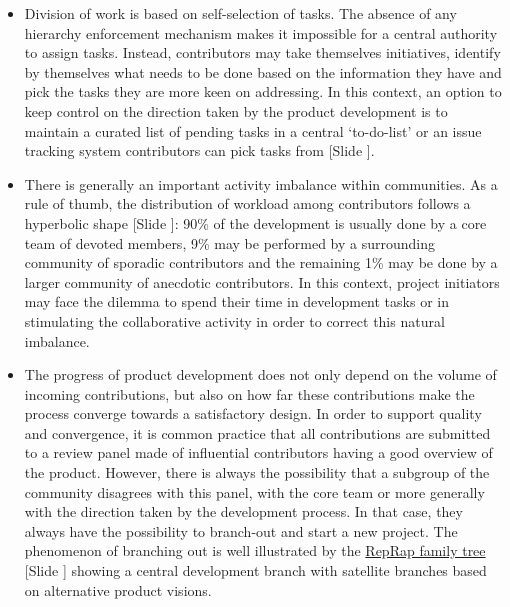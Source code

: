 \documentclass{article}
\newcounter{slide}
\begin{document}
\begin{itemize}
	\item Division of work is based on self-selection of tasks. The absence of any hierarchy enforcement mechanism makes it impossible for a central authority to assign tasks. Instead, contributors may take themselves initiatives, identify by themselves what needs to be done based on the information they have and pick the tasks they are more keen on addressing. In this context, an option to keep control on the direction taken by the product development is to maintain a curated list of pending tasks in a central `to-do-list' or an issue tracking system contributors can pick tasks from {\color{blue}[Slide ]}.
	\item There is generally an important activity imbalance within communities. As a rule of thumb, the distribution of workload among contributors follows a hyperbolic shape {\color{blue}[Slide ]}: 90\% of the development is usually done by a core team of devoted members, 9\% may be performed by a surrounding community of sporadic contributors and the remaining 1\% may be done by a larger community of anecdotic contributors. In this context, project initiators may face the dilemma to spend their time in development tasks or in stimulating the collaborative activity in order to correct this natural imbalance.	
	\item The progress of product development does not only depend on the volume of incoming contributions, but also on how far these contributions make the process converge towards a satisfactory design. In order to support quality and convergence, it is common practice that all contributions are submitted to a review panel made of influential contributors having a good overview of the product. However, there is always the possibility that a subgroup of the community disagrees with this panel, with the core team or more generally with the direction taken by the development process. In that case, they always have the possibility to branch-out and start a new project. The phenomenon of branching out is well illustrated by the \href{https://makezine.com/2015/12/02/a-reprap-family-tree-tracking-the-printers-that-started-it-all/}{RepRap family tree} {\color{blue}[Slide ]} showing a central development branch with satellite branches based on alternative product visions.
\end{itemize}

\bigskip
\end{document}
